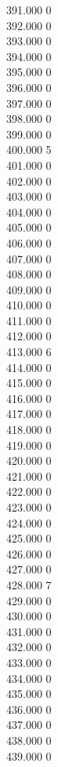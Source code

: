 { 391.000	0 \\
 392.000	0 \\
 393.000	0 \\
 394.000	0 \\
 395.000	0 \\
 396.000	0 \\
 397.000	0 \\
 398.000	0 \\
 399.000	0 \\
 400.000	5 \\
 401.000	0 \\
 402.000	0 \\
 403.000	0 \\
 404.000	0 \\
 405.000	0 \\
 406.000	0 \\
 407.000	0 \\
 408.000	0 \\
 409.000	0 \\
 410.000	0 \\
 411.000	0 \\
 412.000	0 \\
 413.000	6 \\
 414.000	0 \\
 415.000	0 \\
 416.000	0 \\
 417.000	0 \\
 418.000	0 \\
 419.000	0 \\
 420.000	0 \\
 421.000	0 \\
 422.000	0 \\
 423.000	0 \\
 424.000	0 \\
 425.000	0 \\
 426.000	0 \\
 427.000	0 \\
 428.000	7 \\
 429.000	0 \\
 430.000	0 \\
 431.000	0 \\
 432.000	0 \\
 433.000	0 \\
 434.000	0 \\
 435.000	0 \\
 436.000	0 \\
 437.000	0 \\
 438.000	0 \\
 439.000	0 \\
}

